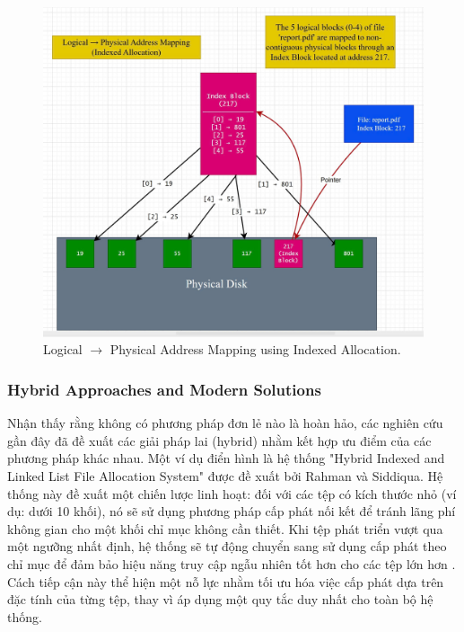 \documentclass[12pt]{article}
\begin{document}
\begin{figure}[H]
    \centering
    \includegraphics[width=\textwidth]{image/diagram mapping Indexed Allocation.jpg}
    \caption{Logical $\rightarrow$ Physical Address Mapping using Indexed Allocation.}
    \label{fig:indexed_allocation_diagram}
\end{figure}

\subsubsection{Hybrid Approaches and Modern Solutions}
Nhận thấy rằng không có phương pháp đơn lẻ nào là hoàn hảo, các nghiên cứu gần đây đã đề xuất các giải pháp lai (hybrid) nhằm kết hợp ưu điểm của các phương pháp khác nhau. Một ví dụ điển hình là hệ thống "Hybrid Indexed and Linked List File Allocation System" được đề xuất bởi Rahman và Siddiqua. Hệ thống này đề xuất một chiến lược linh hoạt: đối với các tệp có kích thước nhỏ (ví dụ: dưới 10 khối), nó sẽ sử dụng phương pháp cấp phát nối kết để tránh lãng phí không gian cho một khối chỉ mục không cần thiết. Khi tệp phát triển vượt qua một ngưỡng nhất định, hệ thống sẽ tự động chuyển sang sử dụng cấp phát theo chỉ mục để đảm bảo hiệu năng truy cập ngẫu nhiên tốt hơn cho các tệp lớn hơn \parencite{IRJMETS2021}. Cách tiếp cận này thể hiện một nỗ lực nhằm tối ưu hóa việc cấp phát dựa trên đặc tính của từng tệp, thay vì áp dụng một quy tắc duy nhất cho toàn bộ hệ thống.

\end{document}
